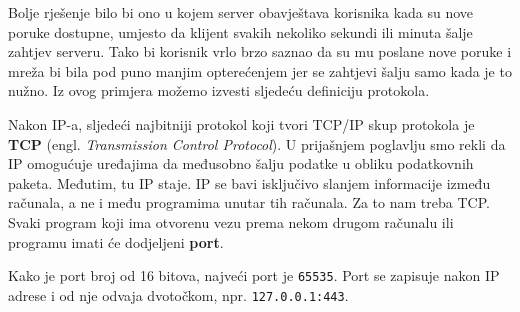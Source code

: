 Bolje rješenje bilo bi ono u kojem server obavještava korisnika kada su nove poruke dostupne, umjesto da klijent svakih nekoliko sekundi ili minuta šalje zahtjev serveru.
Tako bi korisnik vrlo brzo saznao da su mu poslane nove poruke i mreža bi bila pod puno manjim opterećenjem jer se zahtjevi šalju samo kada je to nužno.
Iz ovog primjera možemo izvesti sljedeću definiciju protokola.


Nakon IP-a, sljedeći najbitniji protokol koji tvori TCP/IP skup protokola je \textbf{TCP} (engl. \textit{Transmission Control Protocol}).
U prijašnjem poglavlju smo rekli da IP omogućuje uređajima da međusobno šalju podatke u obliku podatkovnih paketa.
Međutim, tu IP staje.
IP se bavi isključivo slanjem informacije između računala, a ne i među programima unutar tih računala.
Za to nam treba TCP.
Svaki program koji ima otvorenu vezu prema nekom drugom računalu ili programu imati će dodjeljeni \textbf{port}.


Kako je port broj od 16 bitova, najveći port je \verb|65535|.
Port se zapisuje nakon IP adrese i od nje odvaja dvotočkom, npr. \verb|127.0.0.1:443|.

